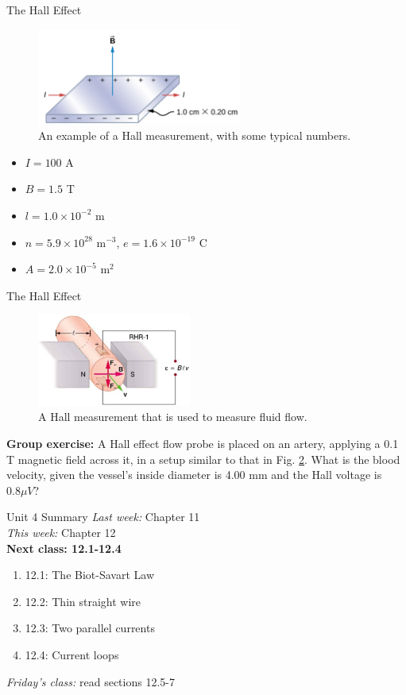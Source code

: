 \documentclass{beamer}
\begin{document}
\begin{frame}{The Hall Effect}
\small
\begin{figure}
\centering
\includegraphics[width=0.6\textwidth]{figures/Hall2.png}
\caption{\label{fig:Hall2} An example of a Hall measurement, with some typical numbers.}
\end{figure}
\begin{itemize}
\item $I = 100$ A
\item $B = 1.5$ T
\item $l = 1.0\times 10^{-2}$ m
\item $n = 5.9 \times 10^{28}$ m$^{-3}$, $e = 1.6 \times 10^{-19}$ C
\item $A = 2.0 \times 10^{-5}$ m$^{2}$
\end{itemize}
\end{frame}

\begin{frame}{The Hall Effect}
\small
\begin{figure}
\centering
\includegraphics[width=0.45\textwidth]{figures/Hall3.png}
\caption{\label{fig:Hall3} A Hall measurement that is used to measure fluid flow.}
\end{figure}
\textbf{Group exercise:} A Hall effect flow probe is placed on an artery, applying a 0.1 T magnetic field across it, in a setup similar to that in Fig. \ref{fig:Hall3}. What is the blood velocity, given the vessel’s inside diameter is 4.00 mm and the Hall voltage is $0.8 \mu V$?
\end{frame}

\begin{frame}{Unit 4 Summary}
\textit{Last week:} Chapter 11 \\
\textit{This week:} Chapter 12 \\
\textbf{Next class: 12.1-12.4}
\begin{enumerate}
\item 12.1: The Biot-Savart Law
\item 12.2: Thin straight wire
\item 12.3: Two parallel currents
\item 12.4: Current loops
\end{enumerate}
\textit{Friday's class:} read sections 12.5-7
\end{frame}
\end{document}
